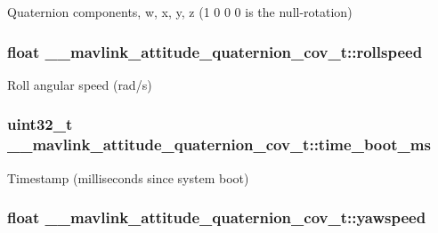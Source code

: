 Quaternion components, w, x, y, z (1 0 0 0 is the null-\/rotation) 

\hypertarget{struct____mavlink__attitude__quaternion__cov__t_a0443969a35d8ad3bb1566c3ef0f40dcd}{
\subsubsection[{rollspeed}]{\setlength{\rightskip}{0pt plus 5cm}float \+\_\+\+\_\+mavlink\+\_\+attitude\+\_\+quaternion\+\_\+cov\+\_\+t\+::rollspeed}}\label{struct____mavlink__attitude__quaternion__cov__t_a0443969a35d8ad3bb1566c3ef0f40dcd}


Roll angular speed (rad/s) 

\hypertarget{struct____mavlink__attitude__quaternion__cov__t_a5404678da915bb511086af8e798563c1}{
\subsubsection[{time\+\_\+boot\+\_\+ms}]{\setlength{\rightskip}{0pt plus 5cm}uint32\+\_\+t \+\_\+\+\_\+mavlink\+\_\+attitude\+\_\+quaternion\+\_\+cov\+\_\+t\+::time\+\_\+boot\+\_\+ms}}\label{struct____mavlink__attitude__quaternion__cov__t_a5404678da915bb511086af8e798563c1}


Timestamp (milliseconds since system boot) 

\hypertarget{struct____mavlink__attitude__quaternion__cov__t_af11fe8bb515cdb575ceeb2cc21dc16ee}{
\subsubsection[{yawspeed}]{\setlength{\rightskip}{0pt plus 5cm}float \+\_\+\+\_\+mavlink\+\_\+attitude\+\_\+quaternion\+\_\+cov\+\_\+t\+::yawspeed}}\label{struct____mavlink__attitude__quaternion__cov__t_af11fe8bb515cdb575ceeb2cc21dc16ee}


